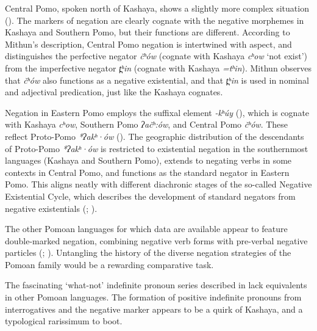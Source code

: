 \documentclass[output=paper,modfonts,nonflat,colorlinks,citecolor=brown]{langscibook}
\begin{document}
Central Pomo, spoken north of Kashaya, shows a slightly more complex situation (\citealt{Mithun1998}). The markers of negation are clearly cognate with the negative morphemes in Kashaya and Southern Pomo, but their functions are different. According to Mithun's description, Central Pomo negation is intertwined with aspect, and distinguishes the perfective negator \textit{čʰów} (cognate with Kashaya \textit{cʰow} `not exist') from the imperfective negator \textit{t̪ʰin} (cognate with Kashaya \textit{=tʰin}). Mithun observes that \textit{čʰów} also functions as a negative existential, and that \textit{t̪ʰin} is used in nominal and adjectival predication, just like the Kashaya cognates.

Negation in Eastern Pomo employs the suffixal element \textit{-kʰúy} (\citealt[105]{McLendon1975}), which is cognate with Kashaya \textit{cʰow}, Southern Pomo \textit{ʔačʰ:ów}, and Central Pomo \textit{čʰów}. These reflect Proto-Pomo \textit{*ʔakʰ·ów} (\citealt[83]{McLendon1973}).
The geographic distribution of the descendants of Proto-Pomo \textit{*ʔakʰ·ów} is restricted to existential negation in the southernmost languages (Kashaya and Southern Pomo), extends to negating verbs in some contexts in Central Pomo, and functions as the standard negator in Eastern Pomo. This aligns neatly with different diachronic stages of the so-called Negative Existential Cycle, which describes the development of standard negators from negative existentials (\citealt{Croft1991}; \citealt{Veselinova2014}).

The other Pomoan languages for which data are available appear to feature double-marked negation, combining negative verb forms with pre-verbal negative particles (\citealt{Moshinsky1974}; \citealt{OConnor1987}). Untangling the history of the diverse negation strategies of the Pomoan family would be a rewarding comparative task.

The fascinating `what-not' indefinite pronoun series described in  lack equivalents in other Pomoan languages. The formation of positive indefinite pronouns from interrogatives and the negative marker appears to be a quirk of Kashaya, and a typological rarissimum to boot.
\end{document}
